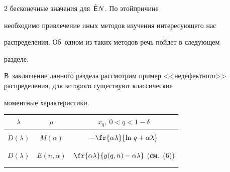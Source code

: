 \begin{multicols}{2}
бесконечные значения для~$\hat{\sf E}N$. По этой\linebreak причине


необходимо привлечение иных методов изучения интересующего нас


распределения. Об~одном из таких методов речь пойдет в сле\-ду\-ющем


разделе.





В~заключение данного раздела рассмотрим пример <<недефектного>> распределения, для которого существуют классические


моментные характеристики.





\begin{table}[b]\small


\begin{center}




\vspace*{2ex}





\tabcolsep=7pt


\begin{tabular}{|c|c|c|}


\hline


$\lambda$&$\mu$&$x_q,\ 0<q<1-\delta$\\


\hline




&&\\[-9pt]


$D(\lambda)$&$M(\alpha)$&$-\displaystyle\fr{\alpha\lambda}{\ln\,q+\alpha\lambda}$\\


&&\\[-9pt]


\hline


&&\\[-9pt]


$D(\lambda)$&$E(n,\alpha)$&$\displaystyle\fr{\alpha\lambda}{y(q,n)-\alpha\lambda}$ (см.~(6))\\


&&\\[-9pt]


\hline


&&\\[-9pt]



\end{tabular}
\end{center}
\end{table}
\end{multicols}
